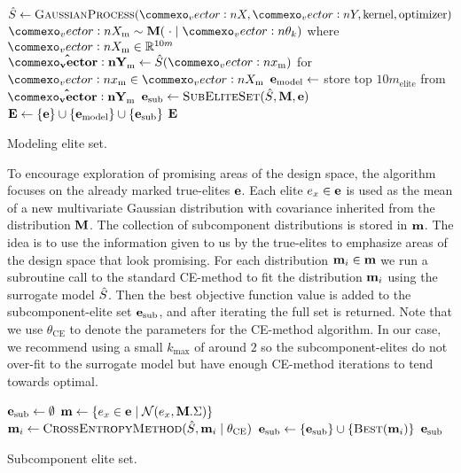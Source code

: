 \begin{algorithm}[ht]
  \begin{algorithmic}
    \State $\surrogate \leftarrow \textproc{GaussianProcess}(\mat{X}, \mat{Y}, \text{kernel}, \text{optimizer})$ %
    \State $\mat{X}_\text{m} \sim \M(\;\cdot \mid \vec{\theta}_k)$ where $\mat{X}_\text{m} \in \R^{10m}$
    \State $\mathbf{\hat{\mat{Y}}}_\text{m} \leftarrow \surrogate(\vec{x}_\text{m})$ for $\vec{x}_\text{m} \in \mat{X}_\text{m}$
    \State $\mathbf{e}_\text{model} \leftarrow$ store top $10m_\text{elite}$ from $\mathbf{\hat{\mat{Y}}}_\text{m}$
    \State $\e_\text{sub} \leftarrow \textproc{SubEliteSet}(\surrogate, \M, \e)$
    \State $\mathbf{E} \leftarrow \{ \mathbf{e} \} \cup \{ \mathbf{e}_\text{model} \} \cup \{ \mathbf{e}_\text{sub} \}$ 
    \State \Return $\mathbf{E}$
  \EndFunction
  \end{algorithmic}
  \caption{\label{alg:model_elite_set} Modeling elite set.}
\end{algorithm}

To encourage exploration of promising areas of the design space, the algorithm  focuses on the already marked true-elites $\mathbf{e}$.
Each elite $e_x \in \mathbf{e}$ is used as the mean of a new multivariate Gaussian distribution with covariance inherited from the distribution $\mathbf{M}$.
The collection of subcomponent distributions is stored in $\mathbf{m}$.
The idea is to use the information given to us by the true-elites to emphasize areas of the design space that look promising.
For each distribution $\mathbf{m}_i \in \mathbf{m}$ we run a subroutine call to the standard CE-method to fit the distribution $\mathbf{m}_i$ using the surrogate model $\hat{S}$. 
Then the best objective function value is added to the subcomponent-elite set $\mathbf{e}_\text{sub}$, and after iterating the full set is returned.
Note that we use $\theta_\text{CE}$ to denote the parameters for the CE-method algorithm.
In our case, we recommend using a small $k_\text{max}$ of around $2$ so the subcomponent-elites do not over-fit to the surrogate model but have enough CE-method iterations to tend towards optimal.

\begin{algorithm}[ht]
  \begin{algorithmic}
    \State $\mathbf{e}_\text{sub} \leftarrow \emptyset$
    \State $\mathbf{m} \leftarrow \{ e_x \in \mathbf{e} \mid \operatorname{\mathcal{N}}(e_x, \mathbf{M}.\Sigma) \}$
        \State $\m_i \leftarrow \textproc{CrossEntropyMethod}(\surrogate, \m_i \mid \theta_{\text{CE}})$
        \State $\e_\text{sub} \leftarrow \{\e_\text{sub}\} \cup \{\textproc{Best}(\m_i)\}$
    \EndFor
    \State \Return $\mathbf{e}_\text{sub}$
  \EndFunction
  \end{algorithmic}
  \caption{\label{alg:sub_elite_set} Subcomponent elite set.}
\end{algorithm}


